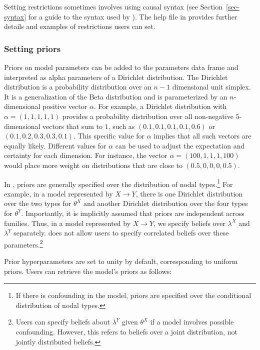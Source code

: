 \documentclass[
  11pt,
  article]{jss}
\renewcommand{\texttt}[1]{\code{#1}}
\begin{document}
Setting restrictions sometimes involves using causal syntax (see
Section~\ref{sec-syntax} for a guide to the syntax used by
). The help file in \texttt{?set\_restrictions}
provides further details and examples of restrictions users can set.

\subsubsection{Setting priors}\label{priors}

Priors on model parameters can be added to the parameters data frame and
interpreted as alpha parameters of a Dirichlet distribution. The
Dirichlet distribution is a probability distribution over an \(n-1\)
dimensional unit simplex. It is a generalization of the Beta
distribution and is parameterized by an \(n\)-dimensional positive
vector \(\alpha\). For example, a Dirichlet distribution with
\(\alpha = (1, 1, 1, 1, 1)\) provides a probability distribution over
all non-negative \(5\)-dimensional vectors that sum to \(1\), such as
\((0.1, 0.1, 0.1, 0.1, 0.6)\) or \((0.1, 0.2, 0.3, 0.3, 0.1)\). This
specific value for \(\alpha\) implies that all such vectors are equally
likely. Different values for \(\alpha\) can be used to adjust the
expectation and certainty for each dimension. For instance, the vector
\(\alpha = (100, 1, 1, 1, 100)\) would place more weight on
distributions that are close to \((0.5, 0, 0, 0, 0.5)\).

In , priors are generally specified over the
distribution of nodal types.\footnote{If there is confounding in the
  model, priors are specified over the conditional distribution of nodal
  types.} For example, in a model represented by \(X \rightarrow Y\),
there is one Dirichlet distribution over the two types for \(\theta^X\)
and another Dirichlet distribution over the four types for \(\theta^Y\).
Importantly, it is implicitly assumed that priors are independent across
families. Thus, in a model represented by \(X \rightarrow Y\), we
specify beliefs over \(\lambda^X\) and \(\lambda^Y\) separately.
 does not allow users to specify correlated beliefs
over these parameters.\footnote{Users can specify beliefs about
  \(\lambda^Y\) given \(\theta^X\) if a model involves possible
  confounding. However, this refers to beliefs over a joint
  distribution, not jointly distributed beliefs.}

Prior hyperparameters are set to unity by default, corresponding to
uniform priors. Users can retrieve the model's priors as follows:
\end{document}
